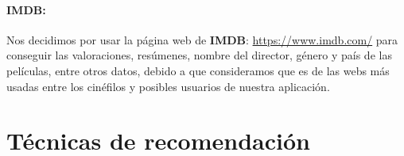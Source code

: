 \paragraph{IMDB:}
Nos decidimos por usar la página web de \textbf{IMDB}: \url{https://www.imdb.com/} para conseguir las valoraciones, resúmenes, nombre del director,
género y país de las películas, entre otros datos, debido a que consideramos que es de las webs más usadas entre los cinéfilos y posibles 
usuarios de nuestra aplicación.

\section{Técnicas de recomendación}
\label{makereference2.6}



